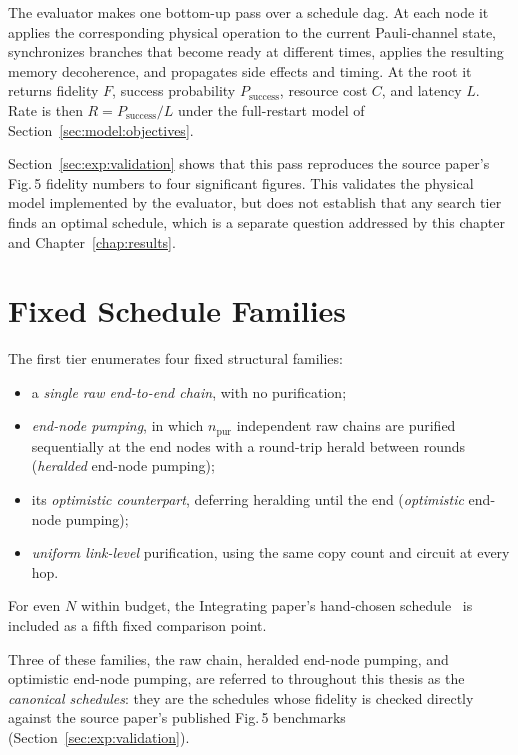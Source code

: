 
The evaluator makes one bottom-up pass over a schedule \Gls{dag}. At each node it applies the corresponding physical operation to the current Pauli-channel state, synchronizes branches that become ready at different times, applies the resulting memory decoherence, and propagates side effects and timing. At the root it returns fidelity $F$, success probability $P_{\mathrm{success}}$, resource cost $C$, and latency $L$. Rate is then $R=P_{\mathrm{success}}/L$ under the full-restart model of Section~\ref{sec:model:objectives}.

Section~\ref{sec:exp:validation} shows that this pass reproduces the source paper's Fig.\,5 fidelity numbers to four significant figures. This validates the physical model implemented by the evaluator, but does not establish that any search tier finds an optimal schedule, which is a separate question addressed by this chapter and Chapter~\ref{chap:results}.

\section{Fixed Schedule Families}
\label{sec:alg:bruteforce}

The first tier enumerates four fixed structural families:
\begin{itemize}
    \item a \emph{single raw end-to-end chain}, with no purification;
    \item \emph{end-node pumping}, in which $n_{\mathrm{pur}}$ independent raw chains are purified sequentially at the end nodes with a round-trip herald between rounds (\emph{heralded} end-node pumping);
    \item its \emph{optimistic counterpart}, deferring heralding until the end (\emph{optimistic} end-node pumping);
    \item \emph{uniform link-level} purification, using the same copy count and circuit at every hop.
\end{itemize}
For even $N$ within budget, the Integrating paper's hand-chosen schedule~\cite{Benchasattabuse2025Integrating} is included as a fifth fixed comparison point.

Three of these families, the raw chain, heralded end-node pumping, and optimistic end-node pumping, are referred to throughout this thesis as the \emph{canonical schedules}: they are the schedules whose fidelity is checked directly against the source paper's published Fig.\,5 benchmarks (Section~\ref{sec:exp:validation}).

